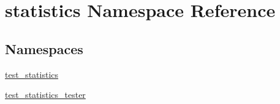 \hypertarget{namespacestatistics}{}\section{statistics Namespace Reference}
\label{namespacestatistics}
\subsection*{Namespaces}
\begin{DoxyCompactItemize}
\item 
 \hyperlink{namespacestatistics_1_1test__statistics}{test\+\_\+statistics}
\item 
 \hyperlink{namespacestatistics_1_1test__statistics__tester}{test\+\_\+statistics\+\_\+tester}
\end{DoxyCompactItemize}
